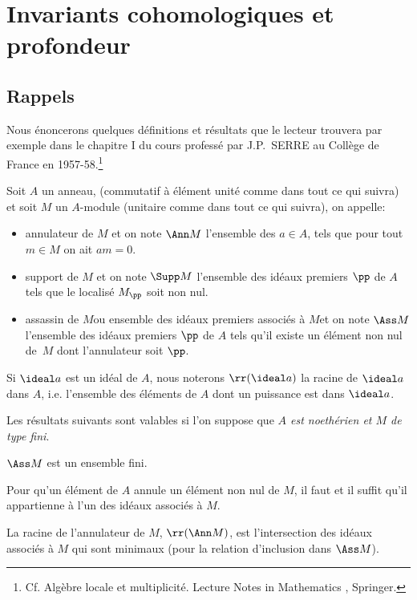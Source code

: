\chapter{Invariants cohomologiques et profondeur} \label{III}

\section{Rappels} \label{III.1}

Nous \'enoncerons quelques d\'efinitions et r\'esultats que le lecteur trouvera par exemple dans le chapitre I du cours profess\'e par J.P.~SERRE au Coll\`ege de France en 1957-58.\footnote{\label{noteserre}Cf. Alg\`ebre locale et multiplicit\'e. Lecture Notes in Mathematics , Springer.}

\begin{definition} \label{def:III.1.1}
Soit $A$ un anneau, (commutatif \`a \'el\'ement unit\'e comme dans tout ce qui suivra) et soit $M$ un $A$-module (unitaire comme dans tout ce qui suivra), on appelle:
\begin{itemize}
\item
annulateur de $M$ et on note $\Ann M$ l'ensemble des $a\in A$, tels que pour tout $m\in M$ on ait $am=0$.

\item
support de $M$ et on note $\Supp M$ l'ensemble des id\'eaux premiers $\pp $ de $A$ tels que le localis\'e $M_\pp$ soit non nul.

\item
\og assassin de $M$\fg ou \og ensemble des id\'eaux premiers associ\'es \`a $M$\fg et on note $\Ass M$ l'ensemble des id\'eaux premiers $\pp $ de $A$ tels qu'il existe un \'el\'ement non nul de~$M$ dont l'annulateur soit $\pp $.
\end{itemize}

Si $\ideal a$ est un id\'eal de $A$, nous noterons $\rr(\ideal a)$ la racine de $\ideal a$ dans $A$, i.e. l'ensemble des \'el\'ements de $A$ dont un puissance est dans $\ideal a$.
\end{definition}

Les r\'esultats suivants sont valables si l'on suppose que \emph{$A$ est noethérien et $M$ de type fini}.

\setcounter{subsection}{0}

\skpt

\begin{proposition} \label{III.1.1}
\begin{enumeratei}
\item
$\Ass M$ est un ensemble fini.

\item
Pour qu'un \'el\'ement de $A$ annule un \'el\'ement non nul de $M$, il faut et il suffit qu'il appartienne \`a l'un des id\'eaux associ\'es \`a $M$.

\item
La racine de l'annulateur de $M$, $\rr(\Ann M)$, est l'intersection des id\'eaux associ\'es \`a $M$ qui sont minimaux (pour la relation d'inclusion dans $\Ass M$).
\end{enumeratei}
\end{proposition}

